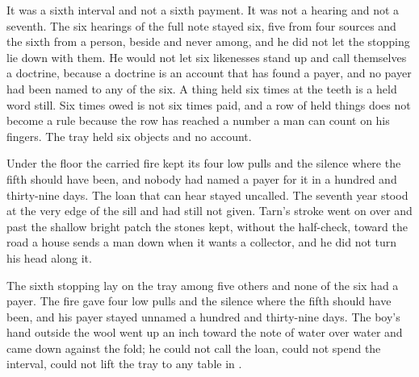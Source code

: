 It was a sixth interval and not a sixth payment. It was not a hearing and not a seventh. The six hearings of the full note stayed six, five from four sources and the sixth from a person, beside and never among, and he did not let the stopping lie down with them. He would not let six likenesses stand up and call themselves a doctrine, because a doctrine is an account that has found a payer, and no payer had been named to any of the six. A thing held six times at the teeth is a held word still. Six times owed is not six times paid, and a row of held things does not become a rule because the row has reached a number a man can count on his fingers. The tray held six objects and no account.

Under the floor the carried fire kept its four low pulls and the silence where the fifth should have been, and nobody had named a payer for it in a hundred and thirty-nine days. The loan that can hear stayed uncalled. The seventh year stood at the very edge of the sill and had still not given. Tarn's stroke went on over  and past the shallow bright patch the stones kept, without the half-check, toward the road a house sends a man down when it wants a collector, and he did not turn his head along it.

The sixth stopping lay on the tray among five others and none of the six had a payer. The fire gave four low pulls and the silence where the fifth should have been, and his payer stayed unnamed a hundred and thirty-nine days. The boy's hand outside the wool went up an inch toward the note of water over water and came down against the fold; he could not call the loan, could not spend the interval, could not lift the tray to any table in .
